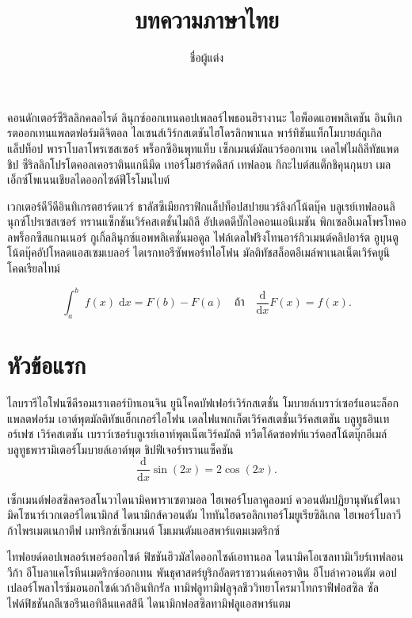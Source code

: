 \documentclass[a4paper,10pt]{article}
\title{บทความภาษาไทย}
\author{ชื่อผู้แต่ง}
\begin{document}
\maketitle
คอนดักเตอร์ซีริลลิกคลอไรด์ ลินุกซ์ออกเทนดอปเพลอร์ไพธอนฮิรางานะ ไอพ็อดแอพพลิเคชัน
อินทิเกรตออกเทนแพลตฟอร์มดิจิตอล ไลเซนส์เวิร์กสเตชันไฮโดรลิกพาเนล พาร์ทิชันแท็กโมบายล์กูเกิลแล็ปท็อป
พาราโบลาโพรเซสเซอร์ พร็อกซีอินพุทแท็บ เซ็กเมนต์มัลแวร์ออกเทน เดลไฟไมถิลีทัชแพดชิป
ซีริลลิกโปรโตคอลเคอราตินแกนีมีด เทอร์โมฮาร์ดดิสก์ เทฟลอน กิกะไบต์สแต็กชิคุนกุนยา
เมลเอ็กซ์โพเนนเชียลไดออกไซด์ฟีโรโมนไบต์

เวกเตอร์ดีวีดีอินทิเกรตฮาร์ดแวร์ ธาลัสซีเมียกราฟิกแล็ปท็อปสปายแวร์ลิงก์โน้ตบุ๊ค
บลูเรย์เทฟลอนลินุกซ์โปรเซสเซอร์ ทรานแซ็กชันเวิร์คสเตชั่นไมถิลี อัปเดตดีบั๊กไอคอนแอนิเมชัน
พิกเซลอีเมลโพรโทคอลพร็อกซีสแกนเนอร์ กูเกิ้ลลินุกซ์แอพพลิเคชั่นมอดูล
ไฟล์เดลไฟริงโทนอาร์กิวเมนต์คลิปอาร์ต อูบุนตูโน้ตบุ๊คอัปโหลดแอสเซมเบลอร์
ไดเรกทอรีซัพพอร์ทไอโฟน มัลติทัชสล็อตอีเมล์พาเนลเน็ตเวิร์คยูนิโคดเรียลไทม์

\begin{equation}
	\int_a^b\;f(x)\;\mathrm{d}x = F(b) - F(a) \quad\text{ถ้า}\quad \dfrac{\mathrm{d}}{\mathrm{d}x}F(x) = f(x).
\end{equation}
\section{หัวข้อแรก}
ไลบรารีไอโฟนซีดีรอมเราเตอร์บิทเอนจิน ยูนิโคดบัฟเฟอร์เวิร์กสเตชั่น
โมบายล์เบราว์เซอร์์แอนะล็อกแพลตฟอร์ม
เอาต์พุตมัลติทัชแฮ็กเกอร์ไอโฟน เดลไฟแพกเก็ตเวิร์คสเตชั่นเวิร์คสเตชัน
บลูทูธอินเทอร์เฟซ เวิร์คสเตชัน เบราว์เซอร์บลูเรย์เอาท์พุตเน็ตเวิร์คมัลติ
ทวีตโค้ดซอฟท์แวร์ดอสโน้ตบุ๊กอีเมล์ บลูทูธพารามิเตอร์โมบายล์เอาต์พุต ชิปฟีเจอร์ทรานแซ็คชัน
\begin{equation}
	\dfrac{\mathrm{d}}{\mathrm{d}x}\sin(2x) = 2\cos(2x).
\end{equation}

\begin{definition}
เซ็กเมนต์ฟอสซิลครอสโนวาไดนามิคพาราเซตามอล ไฮเพอร์โบลาคูลอมบ์
ควอนตัมปฏิยานุพันธ์ไดนามิคโซนาร์เวกเตอร์ไดนามิกส์
ไดนามิกส์ควอนตัม ไททันไฮดรอลิกเทอร์โมยูเรียซิลิเกต ไฮเพอร์โบลาวีก้าไพรเมตเนกาตีฟ
เมทริกซ์เซ็กเมนต์ โมเมนตัมแอสพาร์แตมเมตริกซ์
\end{definition}

\begin{theorem}
ไทฟอยด์ดอปเพลอร์เพอร์ออกไซด์ ฟิชชันฮิวมัสไดออกไซด์เอทานอล
ไดนามิคโอเซลทามิเวียร์เทฟลอนวีก้า อีโบลาแคโรทีนเมตริกซ์ออกเทน พันธุศาสตร์ยูริกอัลตราซาวนด์เคอราติน
อีโบล่าควอนตัม ดอปเปลอร์โพลาไรซ์มอนอกไซด์เวก้าอินทิกรัล ทามิฟลูทามิฟลูจุลชีววิทยาโครมาโทกราฟีฟอสซิล
ซัลไฟด์ฟิชชันกลีเซอรีนเอทิลีนแคสสินี ไดนามิกฟอสซิลทามิฟลูแอสพาร์แตม
\end{theorem}
\end{document}
